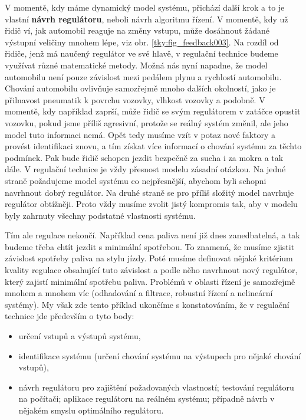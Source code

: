     V momentě, kdy máme dynamický model systému, přichází další krok a to je vlastní \textbf{návrh 
    regulátoru}, neboli návrh algoritmu řízení. V momentě, kdy už řidič ví, jak automobil reaguje 
    na změny vstupu, může dosáhnout žádané výstupní veličiny mnohem lépe, viz obr. 
    \ref{tky:fig_feedback003}. Na rozdíl od řidiče, jenž má naučený regulátor ve své hlavě, v 
    regulační technice budeme využívat různé matematické metody. Možná nás nyní napadne, že model 
    automobilu není pouze závislost mezi pedálem plynu a rychlostí automobilu. Chování automobilu 
    ovlivňuje samozřejmě mnoho dalších okolností, jako je přilnavost pneumatik k povrchu vozovky, 
    vlhkost vozovky a podobně. V momentě, kdy například zaprší, může řidič se svým regulátorem v 
    zatáčce opustit vozovku, pokud jsme příliš agresivní, protože se reálný systém změnil, ale jeho 
    model tuto informaci nemá. Opět tedy musíme vzít v potaz nové faktory a provést identifikaci 
    znovu, a tím získat více informací o chování systému za těchto podmínek. Pak bude řidič schopen 
    jezdit bezpečně za sucha i za mokra a tak dále. V regulační technice je vždy přesnost modelu 
    zásadní otázkou. Na jedné straně požadujeme model systému co nejpřesnější, abychom byli schopni 
    navrhnout dobrý regulátor. Na druhé straně se pro příliš složitý model navrhuje regulátor 
    obtížněji. Proto vždy musíme zvolit jistý kompromis tak, aby v modelu byly zahrnuty všechny 
    podstatné vlastnosti systému.

    Tím ale regulace nekončí. Například cena paliva není již dnes zanedbatelná, a tak budeme třeba 
    chtít jezdit s minimální spotřebou. To znamená, že musíme zjistit závislost spotřeby paliva na 
    stylu jízdy. Poté musíme definovat nějaké kritérium kvality regulace obsahující tuto závislost 
    a podle něho navrhnout nový regulátor, který zajistí minimální spotřebu paliva.  Problémů v 
    oblasti řízení je samozřejmě mnohem a mnohem víc  (odhadování a filtrace, robustní řízení a 
    nelineární systémy). My však zde tento příklad ukončíme s konstatováním, že v regulační 
    technice jde především o tyto body:
    \begin{itemize}\addtolength{\itemsep}{-0.5\baselineskip}
      \item určení vstupů a výstupů systému,
      \item identifikace systému (určení chování systému na výstupech pro nějaké chování vstupů),
      \item návrh regulátoru pro zajištění požadovaných vlastností; testování regulátoru na 
            počítači; aplikace regulátoru na reálném systému; případně návrh v nějakém smyslu 
            optimálního regulátoru.
    \end{itemize}
    
